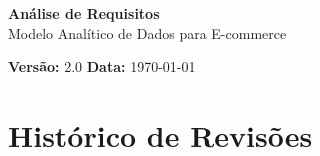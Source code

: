 \documentclass[12pt,a4paper]{article}
\newcommand{\projeto}{Modelo Analítico de Dados para E-commerce}
\newcommand{\data}{\today}
\newcommand{\versao}{2.0}
\begin{document}
\thispagestyle{empty}

\vspace*{\fill}

\begin{center}
    {\Huge \textcolor{AzulCorporativo}{\textbf{Análise de Requisitos}}}\\[0.5cm]
    {\Large \textcolor{AzulPetroleo}{\projeto}}
\end{center}

\vspace*{\fill}

\noindent
\textbf{\textcolor{AzulCorporativo}{Versão:}} \versao
\hfill
\textbf{\textcolor{AzulCorporativo}{Data:}} \data

\newpage

\thispagestyle{empty}

\section*{Histórico de Revisões}

\vspace{0.5cm}
\end{document}

